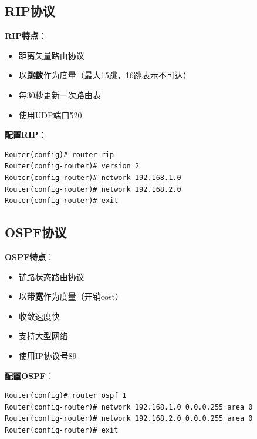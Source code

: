 \documentclass[12pt,a4paper]{ctexart}
\begin{document}
\subsection{RIP协议}

\begin{keybox}
\textbf{RIP特点}：
\begin{itemize}[itemsep=0pt]
    \item 距离矢量路由协议
    \item 以\textbf{跳数}作为度量（最大15跳，16跳表示不可达）
    \item 每30秒更新一次路由表
    \item 使用UDP端口520
\end{itemize}
\end{keybox}

\begin{cmdbox}
\textbf{配置RIP}：
\begin{lstlisting}
Router(config)# router rip
Router(config-router)# version 2
Router(config-router)# network 192.168.1.0
Router(config-router)# network 192.168.2.0
Router(config-router)# exit
\end{lstlisting}
\end{cmdbox}

\subsection{OSPF协议}

\begin{keybox}
\textbf{OSPF特点}：
\begin{itemize}[itemsep=0pt]
    \item 链路状态路由协议
    \item 以\textbf{带宽}作为度量（开销cost）
    \item 收敛速度快
    \item 支持大型网络
    \item 使用IP协议号89
\end{itemize}
\end{keybox}

\begin{cmdbox}
\textbf{配置OSPF}：
\begin{lstlisting}
Router(config)# router ospf 1
Router(config-router)# network 192.168.1.0 0.0.0.255 area 0
Router(config-router)# network 192.168.2.0 0.0.0.255 area 0
Router(config-router)# exit
\end{lstlisting}
\end{cmdbox}

\end{document}
